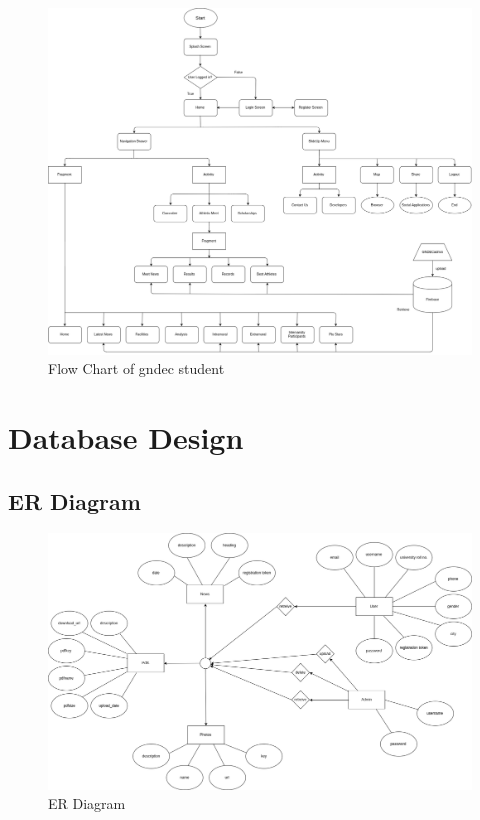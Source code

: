 \newpage
\begin{figure}[ht]
	
	\includegraphics[scale=0.35]{images/Gndecstudent.png}
	\caption{Flow Chart of gndec student}
\end{figure}



\newpage
\section{Database Design}

	\subsection{ER Diagram}
	
	
	\begin{figure}[ht]
		\centering
		\includegraphics[scale=0.35]{images/ergndec.png}
		\caption{ER Diagram}
	\end{figure}
	
